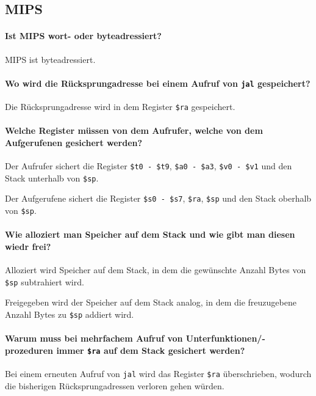         \subsection{MIPS}
            \paragraph{Ist MIPS wort- oder byteadressiert?}
                MIPS ist byteadressiert.

            \paragraph{Wo wird die Rücksprungadresse bei einem Aufruf von \texttt{jal} gespeichert?}
                Die Rücksprungadresse wird in dem Register \texttt{\$ra} gespeichert.

            \paragraph{Welche Register müssen von dem Aufrufer, welche von dem Aufgerufenen gesichert werden?}
                Der Aufrufer sichert die Register \texttt{\$t0 - \$t9}, \texttt{\$a0 - \$a3}, \texttt{\$v0 - \$v1} und den Stack unterhalb von \texttt{\$sp}.

                Der Aufgerufene sichert die Register \texttt{\$s0 - \$s7}, \texttt{\$ra}, \texttt{\$sp} und den Stack oberhalb von \texttt{\$sp}.

            \paragraph{Wie alloziert man Speicher auf dem Stack und wie gibt man diesen wiedr frei?}
                Alloziert wird Speicher auf dem Stack, in dem die gewünschte Anzahl Bytes von \texttt{\$sp} subtrahiert wird.

                Freigegeben wird der Speicher auf dem Stack analog, in dem die freuzugebene Anzahl Bytes zu \texttt{\$sp} addiert wird.

            \paragraph{Warum muss bei mehrfachem Aufruf von Unterfunktionen/-prozeduren immer \texttt{\$ra} auf dem Stack gesichert werden?}
                Bei einem erneuten Aufruf von \texttt{jal} wird das Register \texttt{\$ra} überschrieben, wodurch die bisherigen Rücksprungadressen verloren gehen würden.

